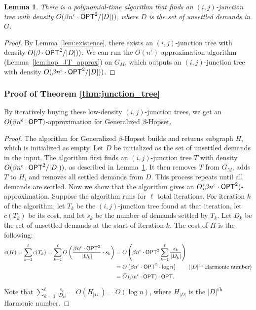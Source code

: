 \documentclass{article}
\newtheorem{lemma}[theorem]{Lemma}
\theoremstyle{definition}
\theoremstyle{remark}
\def\opt {{\sf OPT}}
\def\hopset {{\sc Generalized $\beta$-Hopset}}
\begin{document}
\begin{lemma}
\label{lem:hop_JT_alg}
    There is a polynomial-time algorithm that finds an $(i,j)$-junction tree with density $O(\beta n^\epsilon \cdot {{\opt}}^2 / |D|) )$, where $D$ is the set of unsettled demands in $G$.
\end{lemma}
\begin{proof}
    By Lemma~\ref{lem:existence}, there exists an $(i,j)$-junction tree with density $O(\beta \cdot {{\opt}}^2 / |D|) )$. We can run the $O(n^\epsilon)$-approximation algorithm (Lemma~\ref{lem:hop_JT_approx}) on $G_M$, which outputs an $(i,j)$-junction tree with density $O(\beta n^\epsilon \cdot {{\opt}}^2 / |D|) )$.
\end{proof}

\subsubsection{Proof of Theorem \ref{thm:junction_tree}}

By iteratively buying these low-density $(i,j)$-junction trees, we get an  $O(\beta n^\epsilon \cdot {{\opt}} )$-approximation for {\hopset}.

\begin{proof}
    The algorithm for {\hopset} builds and returns subgraph $H$, which is initialized as empty. Let $D$ be initialized as the set of unsettled demands in the input.
    The algorithm first finds an $(i,j)$-junction tree $T$ with density $O(\beta n^\epsilon \cdot {{\opt}}^2 / |D|) )$, as described in Lemma~\ref{lem:hop_JT_alg}. It then removes $T$ from $G_M$, adds $T$ to $H$, and removes all settled demands from $D$. This process repeats until all demands are settled. 
     Now we show that the algorithm gives an $O(\beta n^\epsilon \cdot {{\opt}}^2 )$-approximation. Suppose the algorithm runs for $\ell$ total iterations. For iteration $k$ of the algorithm, let $T_k$ be the $(i,j)$-junction tree found at that iteration, let $c(T_k)$ be its cost, and let $s_k$ be the number of demands settled by $T_k$. Let $D_k$ be the set of unsettled demands at the start of iteration $k$. The cost of $H$ is the following:
     \begin{align*}
         c(H) = \sum_{k=1}^{\ell} c(T_k) 
         = \sum_{k=1}^{\ell} O\left(   \frac{\beta n^\epsilon \cdot {{\opt}}^2 }{|D_k|}    \cdot s_k \right)  
         &= O \left( \beta n^\epsilon \cdot {{\opt}}^2     \sum_{k=1}^{\ell} \frac{s_k}{|D_k|} \right)  \\
         &= O \left( \beta n^\epsilon \cdot {{\opt}}^2   \cdot \log n \right) \tag{$|D|$\textsuperscript{th} Harmonic number} \\
         &= \widetilde{O}  \left( \beta n^\epsilon \cdot {{\opt}} \right) \cdot {\opt}.
     \end{align*}
    Note that $\sum_{k=1}^{\ell} \frac{s_k}{|D_k|} = O(H_{|D|}) = O(\log n)$, where $H_{|D|}$ is the $|D|$\textsuperscript{th} Harmonic number.
\end{proof}
\end{document}
